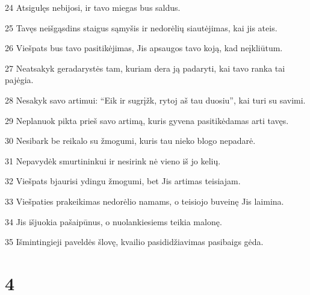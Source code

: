 \par 24 Atsigulęs nebijosi, ir tavo miegas bus saldus. 
\par 25 Tavęs neišgąsdins staigus sąmyšis ir nedorėlių siautėjimas, kai jis ateis. 
\par 26 Viešpats bus tavo pasitikėjimas, Jis apsaugos tavo koją, kad neįkliūtum. 
\par 27 Neatsakyk geradarystės tam, kuriam dera ją padaryti, kai tavo ranka tai pajėgia. 
\par 28 Nesakyk savo artimui: “Eik ir sugrįžk, rytoj aš tau duosiu”, kai turi su savimi. 
\par 29 Neplanuok pikta prieš savo artimą, kuris gyvena pasitikėdamas arti tavęs. 
\par 30 Nesibark be reikalo su žmogumi, kuris tau nieko blogo nepadarė. 
\par 31 Nepavydėk smurtininkui ir nesirink nė vieno iš jo kelių. 
\par 32 Viešpats bjaurisi ydingu žmogumi, bet Jis artimas teisiajam. 
\par 33 Viešpaties prakeikimas nedorėlio namams, o teisiojo buveinę Jis laimina. 
\par 34 Jis išjuokia pašaipūnus, o nuolankiesiems teikia malonę. 
\par 35 Išmintingieji paveldės šlovę, kvailio pasididžiavimas pasibaigs gėda.



\chapter{4}


